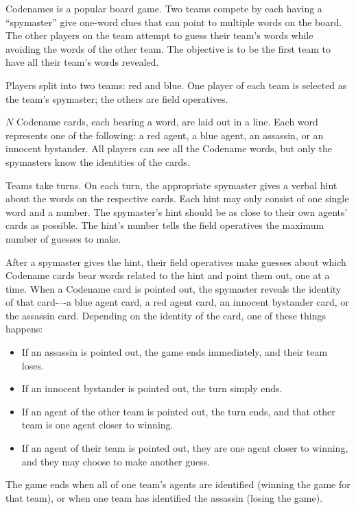 
Codenames is a popular board game. Two teams compete by each having a ``spymaster'' give one-word clues that can point to multiple words on the board. The other players on the team attempt to guess their team's words while avoiding the words of the other team. The objective is to be the first team to have all their team's words revealed.

Players split into two teams: red and blue. One player of each team is selected as the team's spymaster; the others are field operatives.

$N$ Codename cards, each bearing a word, are laid out in a line. Each word represents one of the following: a red agent, a blue agent, an assassin, or an innocent bystander. All players can see all the Codename words, but only the spymasters know the identities of the cards.

Teams take turns. On each turn, the appropriate spymaster gives a verbal hint about the words on the respective cards. Each hint may only consist of one single word and a number. The spymaster's hint should be as close to their own agents' cards as possible. The hint's number tells the field operatives the maximum number of guesses to make.

After a spymaster gives the hint, their field operatives make guesses about which Codename cards bear words related to the hint and point them out, one at a time. When a Codename card is pointed out, the spymaster reveals the identity of that card-–-a blue agent card, a red agent card, an innocent bystander card, or the assassin card. Depending on the identity of the card, one of these things happens:

\begin{itemize}
	\item If an assassin is pointed out, the game ends immediately, and their team loses.
	\item If an innocent bystander is pointed out, the turn simply ends.
	\item If an agent of the other team is pointed out, the turn ends, and that other team is one agent closer to winning.
	\item If an agent of their team is pointed out, they are one agent closer to winning, and they may choose to make another guess.
\end{itemize}

The game ends when all of one team's agents are identified (winning the game for that team), or when one team has identified the assassin (losing the game).

